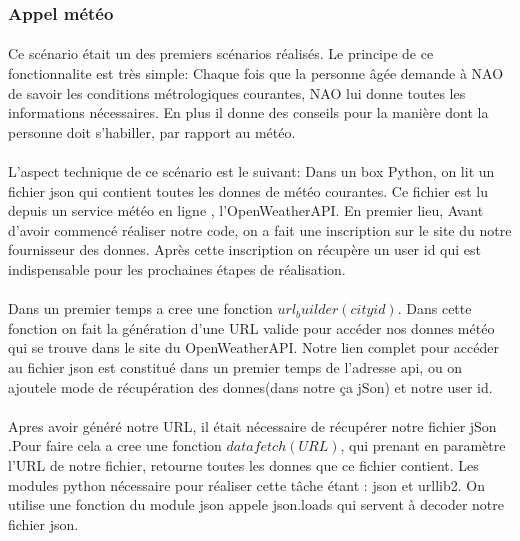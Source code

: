 \documentclass[a4paper,11pt]{article}
\begin{document}
	\subsubsection{Appel météo}
	\paragraph {}Ce scénario était un des premiers scénarios réalisés. Le principe de ce fonctionnalite est très simple: Chaque fois que la personne âgée demande à NAO de savoir les conditions métrologiques courantes, NAO lui donne toutes les informations nécessaires.
En plus il donne des conseils pour la manière dont la personne doit s'habiller, par rapport au météo.
\paragraph{} L'aspect technique de ce scénario est le suivant:
\newline Dans un box Python, on lit un fichier json qui contient toutes les donnes de météo courantes. Ce fichier est lu depuis un service météo en ligne , l'OpenWeatherAPI.
En premier lieu, Avant d'avoir commencé réaliser notre code, on a fait une inscription sur le site du notre fournisseur des donnes. Après cette inscription on récupère un user id qui est indispensable pour les prochaines étapes de réalisation. 
\paragraph{} Dans un premier temps a cree une fonction $url_ builder(city id)$. Dans cette fonction on fait la génération d'une URL valide pour accéder nos donnes météo qui se trouve dans le site du OpenWeatherAPI. Notre lien complet pour accéder au fichier json est constitué dans un premier temps de l'adresse api, ou on ajoutele mode de récupération des donnes(dans notre ça jSon) et notre user id.
\paragraph{} Apres avoir généré notre URL, il était nécessaire de récupérer notre fichier jSon .Pour faire cela a cree une fonction $datafetch(URL)$, qui prenant en paramètre l'URL de notre fichier, retourne toutes les donnes que ce fichier contient. Les modules python nécessaire pour réaliser cette tâche étant : json et urllib2.
\newline On utilise une fonction du module json appele json.loads qui servent à decoder notre fichier json. 
\end{document}
